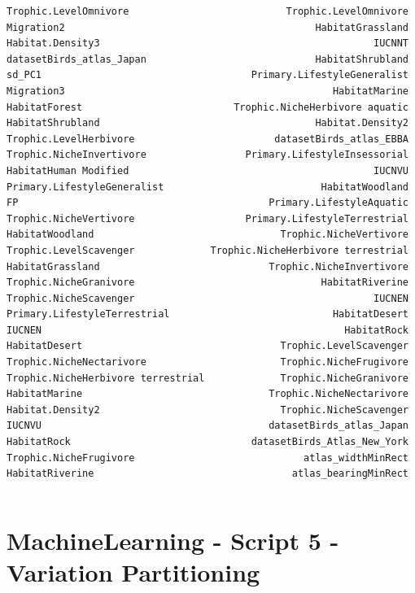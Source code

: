\documentclass[
  letterpaper,
  DIV=11,
  numbers=noendperiod]{scrreprt}
\begin{document}
\begin{verbatim}
Trophic.LevelOmnivore                           Trophic.LevelOmnivore
Migration2                                           HabitatGrassland
Habitat.Density3                                               IUCNNT
datasetBirds_atlas_Japan                             HabitatShrubland
sd_PC1                                    Primary.LifestyleGeneralist
Migration3                                              HabitatMarine
HabitatForest                          Trophic.NicheHerbivore aquatic
HabitatShrubland                                     Habitat.Density2
Trophic.LevelHerbivore                        datasetBirds_atlas_EBBA
Trophic.NicheInvertivore                 Primary.LifestyleInsessorial
HabitatHuman Modified                                          IUCNVU
Primary.LifestyleGeneralist                           HabitatWoodland
FP                                           Primary.LifestyleAquatic
Trophic.NicheVertivore                   Primary.LifestyleTerrestrial
HabitatWoodland                                Trophic.NicheVertivore
Trophic.LevelScavenger             Trophic.NicheHerbivore terrestrial
HabitatGrassland                             Trophic.NicheInvertivore
Trophic.NicheGranivore                                HabitatRiverine
Trophic.NicheScavenger                                         IUCNEN
Primary.LifestyleTerrestrial                            HabitatDesert
IUCNEN                                                    HabitatRock
HabitatDesert                                  Trophic.LevelScavenger
Trophic.NicheNectarivore                       Trophic.NicheFrugivore
Trophic.NicheHerbivore terrestrial             Trophic.NicheGranivore
HabitatMarine                                Trophic.NicheNectarivore
Habitat.Density2                               Trophic.NicheScavenger
IUCNVU                                       datasetBirds_atlas_Japan
HabitatRock                               datasetBirds_Atlas_New_York
Trophic.NicheFrugivore                             atlas_widthMinRect
HabitatRiverine                                  atlas_bearingMinRect
\end{verbatim}

\begin{verbatim}
\end{verbatim}


\chapter{MachineLearning - Script 5 - Variation
Partitioning}\label{machinelearning---script-5---variation-partitioning}
\end{document}
